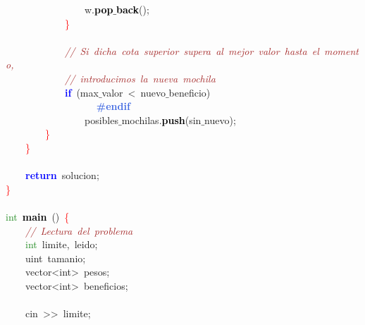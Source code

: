 \mbox{}\ \ \ \ \ \ \ \ \ \ \ \ \ \ \ \ w\textcolor{BrickRed}{.}\textbf{\textcolor{Black}{pop$\_$back}}\textcolor{BrickRed}{();} \\
\mbox{}\ \ \ \ \ \ \ \ \ \ \ \ \textcolor{Red}{\}} \\
\mbox{}\ \ \ \ \ \ \ \ \ \ \ \  \\
\mbox{}\ \ \ \ \ \ \ \ \ \ \ \ \textit{\textcolor{Brown}{//\ Si\ dicha\ cota\ superior\ supera\ al\ mejor\ valor\ hasta\ el\ momento,}} \\
\mbox{}\ \ \ \ \ \ \ \ \ \ \ \ \textit{\textcolor{Brown}{//\ introducimos\ la\ nueva\ mochila}} \\
\mbox{}\ \ \ \ \ \ \ \ \ \ \ \ \textbf{\textcolor{Blue}{if}}\ \textcolor{BrickRed}{(}max$\_$valor\ \textcolor{BrickRed}{\textless{}}\ nuevo$\_$beneficio\textcolor{BrickRed}{)} \\
\mbox{}\textbf{\textcolor{RoyalBlue}{\ \ \ \ \ \ \ \ \ \ \ \ \ \ \ \ \#endif}} \\
\mbox{}\ \ \ \ \ \ \ \ \ \ \ \ \ \ \ \ posibles$\_$mochilas\textcolor{BrickRed}{.}\textbf{\textcolor{Black}{push}}\textcolor{BrickRed}{(}sin$\_$nuevo\textcolor{BrickRed}{);} \\
\mbox{}\ \ \ \ \ \ \ \ \textcolor{Red}{\}} \\
\mbox{}\ \ \ \ \textcolor{Red}{\}} \\
\mbox{}\ \ \ \  \\
\mbox{}\ \ \ \ \textbf{\textcolor{Blue}{return}}\ solucion\textcolor{BrickRed}{;} \\
\mbox{}\textcolor{Red}{\}} \\
\mbox{} \\
\mbox{}\textcolor{ForestGreen}{int}\ \textbf{\textcolor{Black}{main}}\ \textcolor{BrickRed}{()}\ \textcolor{Red}{\{} \\
\mbox{}\ \ \ \ \textit{\textcolor{Brown}{//\ Lectura\ del\ problema}} \\
\mbox{}\ \ \ \ \textcolor{ForestGreen}{int}\ limite\textcolor{BrickRed}{,}\ leido\textcolor{BrickRed}{;} \\
\mbox{}\ \ \ \ \textcolor{TealBlue}{uint}\ tamanio\textcolor{BrickRed}{;} \\
\mbox{}\ \ \ \ \textcolor{TealBlue}{vector\textless{}int\textgreater{}}\ pesos\textcolor{BrickRed}{;} \\
\mbox{}\ \ \ \ \textcolor{TealBlue}{vector\textless{}int\textgreater{}}\ beneficios\textcolor{BrickRed}{;} \\
\mbox{}\ \ \ \  \\
\mbox{}\ \ \ \ cin\ \textcolor{BrickRed}{\textgreater{}\textgreater{}}\ limite\textcolor{BrickRed}{;} \\
